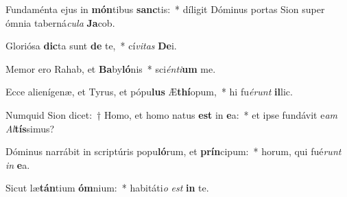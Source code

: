 \item Fundaménta ejus in \textbf{món}tibus \textbf{sanc}tis:~* díligit Dóminus portas Sion super ómnia taberná\textit{cu}\textit{la} \textbf{Ja}cob.
\item Gloriósa \textbf{dic}ta sunt \textbf{de} te,~* cí\textit{vi}\textit{tas} \textbf{De}i.
\item Memor ero Rahab, et \textbf{Ba}by\textbf{ló}nis~* sci\textit{én}\textit{ti}\textbf{um} me.
\item Ecce alienígenæ, et Tyrus, et pópu\textbf{lus} Æ\textbf{thí}opum,~* hi fu\textit{é}\textit{runt} \textbf{il}lic.
\item Numquid Sion dicet:~† Homo, et homo natus \textbf{est} in \textbf{e}a:~* et ipse fundávit e\textit{am} \textit{Al}\textbf{tís}simus?
\item Dóminus narrábit in scriptúris popu\textbf{ló}rum, et \textbf{prín}cipum:~* horum, qui fué\textit{runt} \textit{in} \textbf{e}a.
\item Sicut læ\textbf{tán}tium \textbf{óm}nium:~* habitáti\textit{o} \textit{est} \textbf{in} te.
